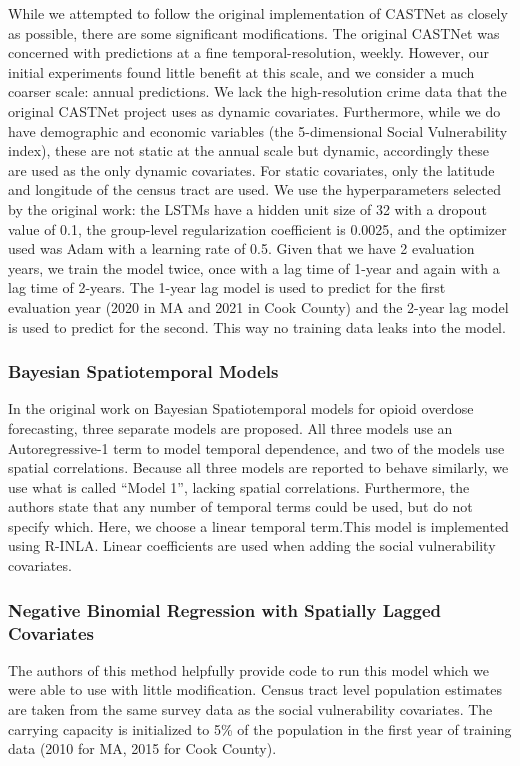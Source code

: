 While we attempted to follow the original implementation of CASTNet\citep{ertugrulCASTNetCommunityAttentiveSpatioTemporal2019} as closely as possible, there are some significant modifications. The original CASTNet was concerned with predictions at a fine temporal-resolution, weekly. However, our initial experiments found little benefit at this scale, and we consider a much coarser scale: annual predictions. We lack the high-resolution crime data that the original CASTNet project uses as dynamic covariates. Furthermore, while we do have demographic and economic variables (the 5-dimensional Social Vulnerability index), these are not static at the annual scale but dynamic, accordingly these are used as the only dynamic covariates. For static covariates, only the latitude and longitude of the census tract are used. We use the hyperparameters selected by the original work: the LSTMs have a hidden unit size of 32 with a dropout value of 0.1, the group-level regularization coefficient is 0.0025, and the optimizer used was Adam with a learning rate of 0.5. Given that we have 2 evaluation years, we train the model twice, once with a lag time of 1-year and again with a lag time of 2-years. The 1-year lag model is used to predict for the first evaluation year (2020 in MA and 2021 in Cook County) and the 2-year lag model is used to predict for the second. This way no training data leaks into the model.

\subsubsection{Bayesian Spatiotemporal Models}\label{bayesian-spatiotemporal-models}

In the original work\citep{bauerSmallAreaForecasting2023} on Bayesian Spatiotemporal models for opioid overdose forecasting, three separate models are proposed. All three models use an Autoregressive-1 term to model temporal dependence, and two of the models use spatial correlations. Because all three models are reported to behave similarly, we use what is called ``Model 1'', lacking spatial correlations. Furthermore, the authors state that any number of temporal terms could be used, but do not specify which. Here, we choose a linear temporal term.This model is implemented using R-INLA\citep{rueApproximateBayesianInference2009}. Linear coefficients are used when adding the social vulnerability covariates.

\subsubsection{Negative Binomial Regression with Spatially Lagged Covariates}\label{negative-binomial-regression-with-spatially-lagged-covariates}

The authors of this method\citep{marksIdentifyingCountiesRisk2021} helpfully provide code to run this model which we were able to use with little modification. Census tract level population estimates are taken from the same survey data as the social vulnerability covariates. The carrying capacity is initialized to 5\% of the population in the first year of training data (2010 for MA, 2015 for Cook County).
